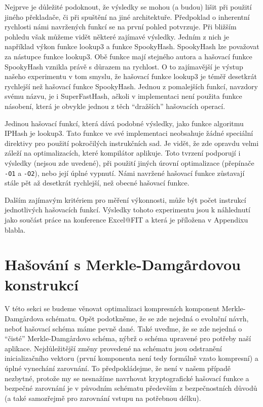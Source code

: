 Nejprve je důležité podoknout, že výsledky se mohou (a budou) lišit při použití jiného překladače, či při spuštění na jiné
architektuře. Předpoklad o inherentní rychlosti námi navržených funkcí se na první pohled potvrzuje. Při bližším pohledu však
můžeme vidět některé zajímavé výsledky. Jedním z nich je například výkon funkce lookup3 a funkce SpookyHash. SpookyHash lze
považovat za nástupce funkce lookup3. Obě funkce mají stejného autora a hašovací funkce SpookyHash vznikla právě s důrazem
na rychlost. O to zajímavější je výstup našeho experimentu v tom smyslu, že hašovací funkce lookup3 je téměř desetkrát
rychlejší než hašovací funkce SpookyHash. Jednou z pomalejších funkcí, navzdory svému názvu, je i SuperFastHash, ačkoli v
implementaci není použita funkce násobení, která je obvykle jednou z těch ``dražších'' hašovacích operací. 

Jedinou hašovací funkcí, která dává podobné výsledky, jako funkce algoritmu IPHash je lookup3. Tato funkce ve své
implementaci neobsahuje žádné speciální direktivy pro použití pokročilých instrukčních sad. Je vidět, že zde opravdu
velmi záleží na optimalizacích, které kompilátor aplikuje. Toto tvrzení podporují i výsledky (nejsou zde uvedené), při
použití jiných úrovní optimalizace (přepínače \texttt{-O1} a \texttt{-O2}), nebo její úplné vypnutí. Námi navržené hašovací
funkce zůstavají stále pět až desetkrát rychlejší, než obecné hašovací funkce. 

Dalším zajímavým kritériem pro měření výkonnosti, může být počet instrukcí jednotlivých hašovacích funkcí. Výsledky tohoto
experimentu jsou k náhlednutí jako součást práce na konference Excel@FIT a která je příložena v Appendixu blabla. 

\newpage
\section{Hašování s Merkle-Damg\r{a}rdovou konstrukcí}

V této sekci se budeme věnovat optimalizaci kompresních komponent Merkle-Damg\r{a}rdova schématu. Opět podotkněme,
že se zde nejedná o evoluční návrh, neboť hašovací schéma máme pevně dané. Také uveďme, že se zde nejedná o 
``čisté'' Merkle-Damg\r{a}rdovo schéma, nýbrž o schéma upravené pro potřeby naší aplikace. Nejdůležitější změny provedené
na schématu jsou odstranění inicializačního vektoru (první komponenta není tedy formálně vzato kompresní) a úplné 
vynechání zarovnání. To předpokládejme, že není v našem případě nezbytné, protože my se nesnažíme navrhovat 
kryptografické hašovací funkce a bezpečné zarovnání je v původním schématu především z bezpečnostních důvodů (a také
samozřejmě pro zarovnání vstupu na potřebnou délku).

